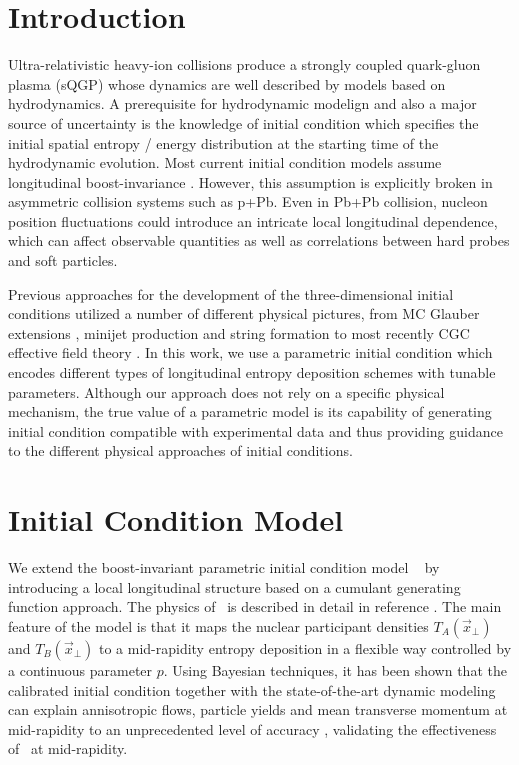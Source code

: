 \documentclass[3p,times,twocolumn]{elsarticle}
\begin{document}

\section{Introduction}
\label{Introduction}
Ultra-relativistic heavy-ion collisions produce a strongly coupled quark-gluon plasma (sQGP) whose dynamics are well described by models based on hydrodynamics.
A prerequisite for hydrodynamic modelign and also a major source of uncertainty is the knowledge of initial condition which specifies the initial spatial entropy / energy distribution at the starting time of the hydrodynamic evolution.
Most current initial condition models assume longitudinal boost-invariance \cite{Miller:2007ri, Drescher:2006ca, Schenke:2012wb, Niemi:2015qia, Moreland:2014oya}.
However, this assumption is explicitly broken in asymmetric collision systems such as p+Pb.
Even in Pb+Pb collision, nucleon position fluctuations could introduce an intricate local longitudinal dependence, which can affect observable quantities as well as correlations between hard probes and soft particles.

Previous approaches for the development of the three-dimensional initial conditions utilized a number of different physical pictures, from MC Glauber extensions \cite{Bozek:2015bha}, minijet production and string formation \cite{Wang:1991hta} to most recently CGC effective field theory \cite{Schenke:2016ksl}.
In this work, we use a parametric initial condition which encodes different types of longitudinal entropy deposition schemes with tunable parameters.
Although our approach does not rely on a specific physical mechanism, the true value of a parametric model is its capability of generating initial condition compatible with experimental data and thus providing guidance to the different physical approaches of initial conditions.

\section{Initial Condition Model}
\label{Model}
We extend the boost-invariant parametric initial condition model \trento~\cite{Moreland:2014oya} by introducing a local longitudinal structure based on a cumulant generating function approach.
The physics of \trento~is described in detail in reference \cite{Moreland:2014oya}. The main feature of the model is that it maps the nuclear participant densities $T_A(\vec{x}_{\perp})$ and $T_B(\vec{x}_{\perp})$ to a mid-rapidity entropy deposition in a flexible way controlled by a continuous parameter $p$.
Using Bayesian techniques, it has been shown that the calibrated initial condition together with the state-of-the-art dynamic modeling can explain annisotropic flows, particle yields and mean transverse momentum at mid-rapidity to an unprecedented level of accuracy \cite{Bernhard:2016tnd}, validating the effectiveness of \trento~at mid-rapidity.
\end{document}
